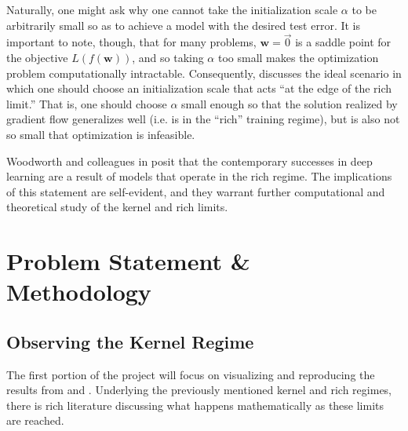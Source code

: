 \documentclass{article}
\begin{document}
Naturally, one might ask why one cannot take the initialization scale $\alpha$ to be arbitrarily small so as to achieve a model with the desired test error. It is important to note, though, that for many problems, $\boldsymbol{w} = \vec{0}$ is a saddle point for the objective $L(f(\boldsymbol{w}))$, and so taking $\alpha$ too small makes the optimization problem computationally intractable. Consequently, \cite{woodworth2020kernel} discusses the ideal scenario in which one should choose an initialization scale that acts \enquote{at the edge of the rich limit.} That is, one should choose $\alpha$ small enough so that the solution realized by gradient flow generalizes well (i.e. is in the \enquote{rich} training regime), but is also not so small that optimization is infeasible. 

Woodworth and colleagues in \cite{woodworth2020kernel} posit that the contemporary successes in deep learning are a result of models that operate in the rich regime. The implications of this statement are self-evident, and they warrant further computational and theoretical study of the kernel and rich limits.

\section{Problem Statement \& Methodology}

\subsection{Observing the Kernel Regime}
The first portion of the project will focus on visualizing and reproducing the results from \cite{chizat2018lazy} and \cite{woodworth2020kernel}. Underlying the previously mentioned kernel and rich regimes, there is rich literature discussing what happens mathematically as these limits are reached. 
\end{document}
